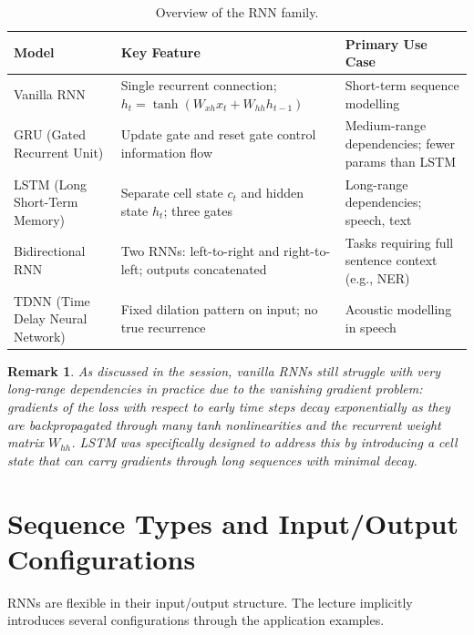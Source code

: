 \documentclass[12pt,a4paper]{article}
\newtheorem{remark}{Remark}[section]
\newcommand{\Whh}{W_{hh}}
\newcommand{\Wxh}{W_{xh}}
\begin{document}
\begin{table}[ht]
  \centering
  \caption{Overview of the RNN family.}
  \label{tab:rnn_variants}
  \begin{tabularx}{\linewidth}{lXX}
    \toprule
    \textbf{Model} & \textbf{Key Feature} & \textbf{Primary Use Case} \\
    \midrule
    Vanilla RNN &
      Single recurrent connection; $h_t = \tanh(\Wxh x_t + \Whh h_{t-1})$ &
      Short-term sequence modelling \\
    GRU (Gated Recurrent Unit) &
      Update gate and reset gate control information flow &
      Medium-range dependencies; fewer params than LSTM \\
    LSTM (Long Short-Term Memory) &
      Separate cell state $c_t$ and hidden state $h_t$; three gates &
      Long-range dependencies; speech, text \\
    Bidirectional RNN &
      Two RNNs: left-to-right and right-to-left; outputs concatenated &
      Tasks requiring full sentence context (e.g., NER) \\
    TDNN (Time Delay Neural Network) &
      Fixed dilation pattern on input; no true recurrence &
      Acoustic modelling in speech \\
    \bottomrule
  \end{tabularx}
\end{table}

\begin{remark}
As discussed in the session, vanilla RNNs still struggle with very
long-range dependencies in practice due to the \emph{vanishing gradient
problem}: gradients of the loss with respect to early time steps decay
exponentially as they are backpropagated through many tanh nonlinearities
and the recurrent weight matrix $\Whh$.  LSTM was specifically designed to
address this by introducing a cell state that can carry gradients through
long sequences with minimal decay.
\end{remark}

\section{Sequence Types and Input/Output Configurations}
\label{sec:io_configs}

RNNs are flexible in their input/output structure.  The lecture implicitly
introduces several configurations through the application examples.
\end{document}
